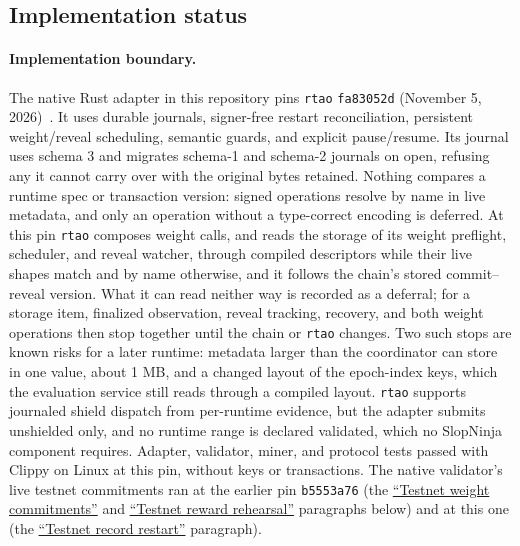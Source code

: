 \subsection{Implementation status}\label{implementation-status}

\paragraph{Implementation boundary.}\label{native-implementation-boundary}
The native Rust adapter in this repository pins \texttt{rtao}
\texttt{fa83052d} (November 5, 2026)~\cite{nativeadapter}. It uses durable
journals, signer-free restart reconciliation, persistent weight/reveal
scheduling, semantic guards, and explicit pause/resume. Its journal uses schema
3 and migrates schema-1 and schema-2 journals on open, refusing any it cannot
carry over with the original bytes retained. Nothing compares a runtime spec or
transaction version: signed operations resolve by name in live metadata, and
only an operation without a type-correct encoding is deferred. At this pin
\texttt{rtao} composes weight calls, and reads the storage of its weight
preflight, scheduler, and reveal watcher, through compiled descriptors while
their live shapes match and by name otherwise, and it follows the chain's
stored commit--reveal version. What it can read neither way is recorded as a
deferral; for a storage item, finalized observation, reveal tracking, recovery,
and both weight operations then stop together until the chain or \texttt{rtao}
changes. Two such stops are known risks for a later runtime: metadata larger
than the coordinator can store in one value, about 1 MB, and a changed layout
of the epoch-index keys, which the evaluation service still reads through a
compiled layout. \texttt{rtao} supports journaled shield dispatch from
per-runtime evidence, but the adapter submits unshielded only, and no runtime
range is declared validated, which no SlopNinja component requires. Adapter,
validator, miner, and protocol tests passed with Clippy on Linux at this pin,
without keys or transactions. The native validator's live testnet commitments
ran at the earlier pin \texttt{b5553a76}
(the \hyperref[testnet-m2]{``Testnet weight commitments''} and
\hyperref[testnet-reward-v1]{``Testnet reward rehearsal''} paragraphs below) and
at this one (the \hyperref[testnet-r1]{``Testnet record restart''} paragraph).

